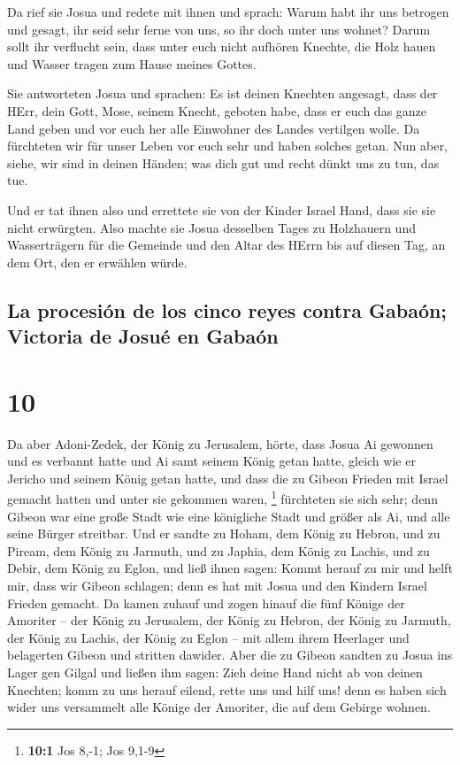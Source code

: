  Da rief sie Josua und redete mit ihnen und sprach: Warum
habt ihr uns betrogen und gesagt, ihr seid sehr ferne von uns, so ihr
doch unter uns wohnet?  Darum sollt ihr verflucht sein,
dass unter euch nicht aufhören Knechte, die Holz hauen und Wasser tragen
zum Hause meines Gottes.

 Sie antworteten Josua und sprachen: Es ist deinen
Knechten angesagt, dass der HErr, dein Gott, Mose, seinem Knecht,
geboten habe, dass er euch das ganze Land geben und vor euch her alle
Einwohner des Landes vertilgen wolle. Da fürchteten wir für unser Leben
vor euch sehr und haben solches getan.  Nun aber, siehe,
wir sind in deinen Händen; was dich gut und recht dünkt uns zu tun, das
tue.

 Und er tat ihnen also und errettete sie von der Kinder
Israel Hand, dass sie sie nicht erwürgten.  Also machte
sie Josua desselben Tages zu Holzhauern und Wasserträgern für die
Gemeinde und den Altar des HErrn bis auf diesen Tag, an dem Ort, den er
erwählen würde.

\hypertarget{la-procesiuxf3n-de-los-cinco-reyes-contra-gabauxf3n-victoria-de-josuuxe9-en-gabauxf3n}{%
\subsection{La procesión de los cinco reyes contra Gabaón; Victoria de
Josué en
Gabaón}\label{la-procesiuxf3n-de-los-cinco-reyes-contra-gabauxf3n-victoria-de-josuuxe9-en-gabauxf3n}}

\hypertarget{section-9}{%
\section{10}\label{section-9}}

 Da aber Adoni-Zedek, der König zu Jerusalem, hörte, dass
Josua Ai gewonnen und es verbannt hatte und Ai samt seinem König getan
hatte, gleich wie er Jericho und seinem König getan hatte, und dass die
zu Gibeon Frieden mit Israel gemacht hatten und unter sie gekommen
waren, \footnote{\textbf{10:1} Jos 8,-1; Jos 9,1-9} 
fürchteten sie sich sehr; denn Gibeon war eine große Stadt wie eine
königliche Stadt und größer als Ai, und alle seine Bürger streitbar.
 Und er sandte zu Hoham, dem König zu Hebron, und zu
Piream, dem König zu Jarmuth, und zu Japhia, dem König zu Lachis, und zu
Debir, dem König zu Eglon, und ließ ihnen sagen:  Kommt
herauf zu mir und helft mir, dass wir Gibeon schlagen; denn es hat mit
Josua und den Kindern Israel Frieden gemacht.  Da kamen
zuhauf und zogen hinauf die fünf Könige der Amoriter -- der König zu
Jerusalem, der König zu Hebron, der König zu Jarmuth, der König zu
Lachis, der König zu Eglon -- mit allem ihrem Heerlager und belagerten
Gibeon und stritten dawider.  Aber die zu Gibeon sandten
zu Josua ins Lager gen Gilgal und ließen ihm sagen: Zieh deine Hand
nicht ab von deinen Knechten; komm zu uns herauf eilend, rette uns und
hilf uns! denn es haben sich wider uns versammelt alle Könige der
Amoriter, die auf dem Gebirge wohnen.

